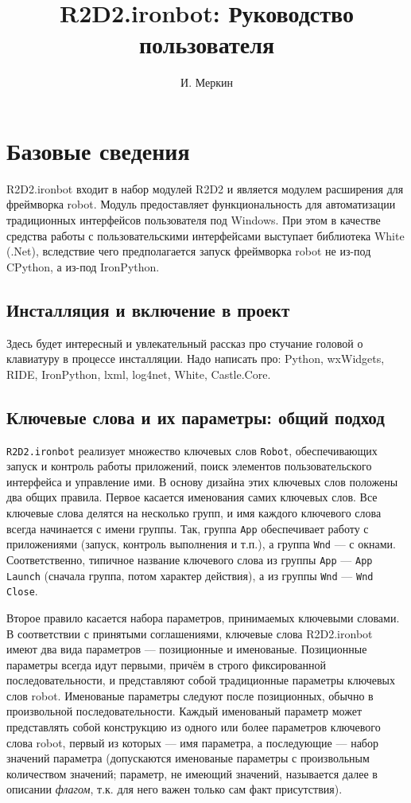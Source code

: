 \documentclass[11pt]{book} %
\title{R2D2.ironbot: Руководство пользователя}
\author{И. Меркин}
\begin{document}
\maketitle

\tableofcontents

\chapter{Базовые сведения}

R2D2.ironbot входит в набор модулей R2D2 и является модулем расширения для фреймворка robot. Модуль предоставляет функциональность для автоматизации традиционных интерфейсов пользователя под Windows. При этом в качестве средства работы с пользовательскими интерфейсами выступает библиотека White (.Net), вследствие чего предполагается запуск фреймворка robot не из-под CPython, а из-под IronPython.

\section{Инсталляция и включение в проект}

Здесь будет интересный и увлекательный рассказ про стучание головой о клавиатуру в процессе инсталляции. Надо написать про:
Python, wxWidgets, RIDE, IronPython, lxml, log4net, White, Castle.Core.


\section{Ключевые слова и их параметры: общий подход}

\verb|R2D2.ironbot| реализует множество ключевых слов \verb|Robot|, обеспечивающих запуск и контроль работы приложений, поиск элементов пользовательского интерфейса и управление ими.
В основу дизайна этих ключевых слов положены два общих правила. Первое касается именования самих ключевых слов. Все ключевые слова делятся на несколько групп, и имя каждого ключевого слова всегда начинается с имени группы. Так, группа \verb"App" обеспечивает работу с приложениями (запуск, контроль выполнения и т.п.), а группа \verb"Wnd" --- с окнами. Соответственно, типичное название ключевого слова из группы \verb"App" --- \verb"App Launch" (сначала группа, потом характер действия), а из группы \verb"Wnd"  --- \verb"Wnd Close".

Второе правило касается набора параметров, принимаемых ключевыми словами. В соответствии с принятыми соглашениями, ключевые слова R2D2.ironbot имеют два вида параметров --- позиционные и именованые. Позиционные параметры всегда идут первыми, причём в строго фиксированной последовательности, и представляют собой традиционные параметры ключевых слов robot. Именованые параметры следуют после позиционных, обычно в произвольной последовательности. Каждый именованый параметр может представлять собой конструкцию из одного или более параметров ключевого слова robot, первый из которых --- имя параметра, а последующие --- набор значений параметра (допускаются именованые параметры с произвольным количеством значений; параметр, не имеющий значений, называется далее в описании \emph{флагом}, т.к. для него важен только сам факт присутствия).
\end{document}
